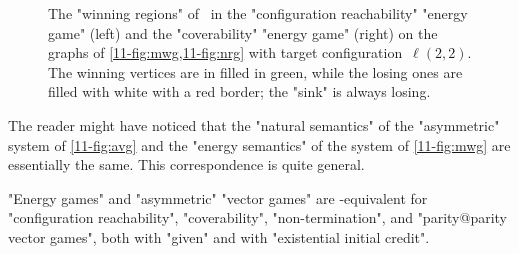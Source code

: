 \begin{figure}[htbp]
{}
  \caption{The "winning regions" of \Eve\ in the
    "configuration reachability" "energy game" (left) and the
    "coverability" "energy game"
    (right) on the graphs of \cref{11-fig:mwg,11-fig:nrg} with target
    configuration~$\ell(2,2)$.  The winning vertices are in filled in
    green, while the losing ones are filled with white with a red
    border; the "sink" is always losing.}\label{11-fig:cov-nrg}
\end{figure}

The reader might have noticed that the "natural semantics" of the
"asymmetric" system of \cref{11-fig:avg} and the "energy semantics" of
the system of \cref{11-fig:mwg} are essentially the same.  This
correspondence is quite general.
\begin{lemma}
\label{11-lem:nrg}
  "Energy games" and "asymmetric" "vector games" are
  \logspace-equivalent for "configuration reachability",
  "coverability", "non-termination", and "parity@parity vector games",
  both with "given" and with "existential initial credit".
\end{lemma}
